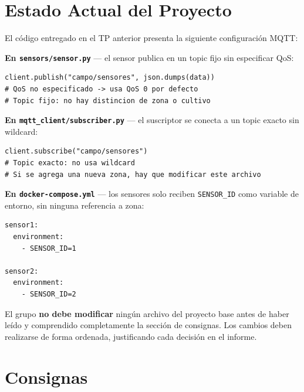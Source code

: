 \documentclass[12pt,a4paper]{article}
\begin{document}
\section{Estado Actual del Proyecto}

El código entregado en el TP anterior presenta la siguiente configuración MQTT:

\textbf{En \texttt{sensors/sensor.py}} — el sensor publica en un topic fijo
sin especificar QoS:

\begin{lstlisting}[style=python]
client.publish("campo/sensores", json.dumps(data))
# QoS no especificado -> usa QoS 0 por defecto
# Topic fijo: no hay distincion de zona o cultivo
\end{lstlisting}

\textbf{En \texttt{mqtt\_client/subscriber.py}} — el suscriptor se conecta
a un topic exacto sin wildcard:

\begin{lstlisting}[style=python]
client.subscribe("campo/sensores")
# Topic exacto: no usa wildcard
# Si se agrega una nueva zona, hay que modificar este archivo
\end{lstlisting}

\textbf{En \texttt{docker-compose.yml}} — los sensores solo reciben
\texttt{SENSOR\_ID} como variable de entorno, sin ninguna referencia a zona:

\begin{lstlisting}[style=texto]
sensor1:
  environment:
    - SENSOR_ID=1

sensor2:
  environment:
    - SENSOR_ID=2
\end{lstlisting}

\begin{atencion}
El grupo \textbf{no debe modificar} ningún archivo del proyecto base antes de
haber leído y comprendido completamente la sección de consignas. Los cambios
deben realizarse de forma ordenada, justificando cada decisión en el informe.
\end{atencion}

\section{Consignas}
\end{document}
